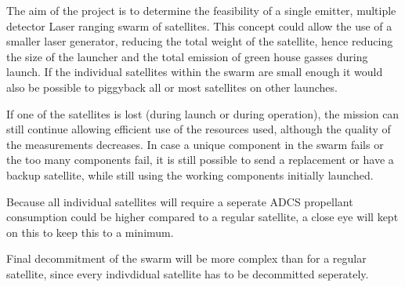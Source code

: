 \label{dseSustainable}

The aim of the project is to determine the feasibility of a single emitter, multiple detector Laser ranging swarm of satellites. This concept could allow the use of a smaller laser generator, reducing the total weight of the satellite, hence reducing the size of the launcher and the total emission of green house gasses during launch. If the individual satellites within the swarm are small enough it would also be possible to piggyback all or most satellites on other launches. 

If one of the satellites is lost (during launch or during operation), the mission can still continue allowing efficient use of the resources used, although the quality of the measurements decreases. In case a unique component in the swarm fails or the too many components fail, it is still possible to send a replacement or have a backup satellite, while still using the working components initially launched.

Because all individual satellites will require a seperate ADCS propellant consumption could be higher compared to a regular satellite, a close eye will kept on this to keep this to a minimum.

Final decommitment of the swarm will be more complex than for a regular satellite, since every indivdidual satellite has to be decommitted seperately.